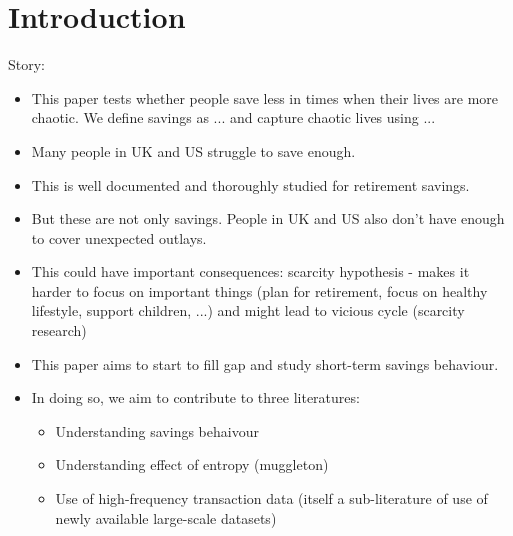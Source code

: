 
\section{Introduction}%
\label{sec:introduction}

Story:
\begin{itemize}

    \item This paper tests whether people save less in times when their lives
        are more chaotic. We define savings as ... and capture chaotic lives
        using ...

    \item Many people in UK and US struggle to save
        enough.

    \item This is well documented and thoroughly studied for retirement
        savings.

    \item But these are not only savings. People in UK and US also don't have
        enough to cover unexpected outlays.

    \item This could have important consequences: scarcity hypothesis - makes
        it harder to focus on important things (plan for retirement, focus on
        healthy lifestyle, support children, ...) and might lead to vicious
        cycle (scarcity research)

    \item This paper aims to start to fill gap and study short-term savings
        behaviour.

    \item In doing so, we aim to contribute to three literatures:

    \begin{itemize}
        \item Understanding savings behaivour

        \item Understanding effect of entropy (muggleton)

        \item Use of high-frequency transaction data (itself a sub-literature of
            use of newly available large-scale datasets)
    \end{itemize}
\end{itemize}




